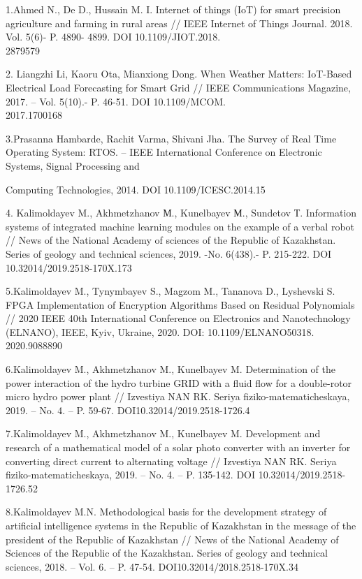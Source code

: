 \begin{noparindent}

1.Ahmed N., De D., Hussain M. I. Internet of things (IoT) for smart
precision agriculture and farming in rural areas // IEEE Internet of
Things Journal. 2018. Vol. 5(6)- P. 4890- 4899. DOI 10.1109/JIOT.2018.\\2879579

2. Liangzhi Li, Kaoru Ota, Mianxiong Dong. When Weather Matters:
IoT-Based Electrical Load Forecasting for Smart Grid // IEEE
Communications Magazine, 2017. -- Vol. 5(10).- P. 46-51. DOI
10.1109/MCOM.\\2017.1700168

3.Prasanna Hambarde, Rachit Varma, Shivani Jha. The Survey of Real Time
Operating System: RTOS. -- IEEE International Conference on Electronic
Systems, Signal Processing and

Computing Technologies, 2014. DOI 10.1109/ICESC.2014.15

4. Kalimoldayev M., Akhmetzhanov М., Kunelbayev М., Sundetov Т.
Information systems of integrated machine learning modules on the
example of a verbal robot // News of the National Academy of sciences of
the Republic of Kazakhstan. Series of geology and technical sciences,
2019. -No. 6(438).- P. 215-222. DOI 10.32014/2019.2518-170X.173

5.Kalimoldayev M., Tynymbayev S., Magzom M., Tananova D., Lyshevski S.
FPGA Implementation of Encryption Algorithms Based on Residual
Polynomials // 2020 IEEE 40th International Conference on Electronics
and Nanotechnology (ELNANO), IEEE, Kyiv, Ukraine, 2020. DOI:
10.1109/ELNANO50318.\\2020.9088890

6.Kalimoldayev M., Akhmetzhanov M., Kunelbayev M. Determination of the
power interaction of the hydro turbine GRID with a fluid flow for a
double-rotor micro hydro power plant // Izvestiya NAN RK. Seriya
fiziko-matematicheskaya, 2019. -- No. 4. -- P. 59-67.
DOI10.32014/2019.2518-1726.4

7.Kalimoldayev M., Akhmetzhanov M., Kunelbayev M. Development and
research of a mathematical model of a solar photo converter with an
inverter for converting direct current to alternating voltage //
Izvestiya NAN RK. Seriya fiziko-matematicheskaya, 2019. -- No. 4. -- P.
135-142. DOI 10.32014/2019.2518-1726.52

8.Kalimoldayev M.N. Methodological basis for the development strategy of
artificial intelligence systems in the Republic of Kazakhstan in the
message of the president of the Republic of Kazakhstan // News of the
National Academy of Sciences of the Republic of the Kazakhstan. Series
of geology and technical sciences, 2018. -- Vol. 6. -- P. 47-54.
DOI10.32014/2018.2518-170X.34


\end{noparindent}
